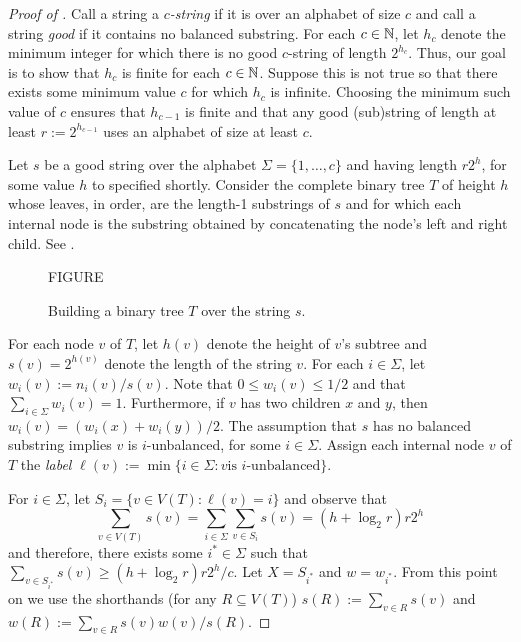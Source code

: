 \documentclass{patmorin}
\begin{document}
\begin{proof}[Proof of ]
  Call a string a \emph{$c$-string} if it is over an alphabet of size $c$
  and call a string \emph{good} if it contains no balanced substring.
  For each $c\in\mathbb{N}$, let $h_c$ denote the minimum integer for which
  there is no good $c$-string of length $2^{h_c}$.  Thus, our goal is
  to show that $h_c$ is finite for each $c\in\mathbb{N}$.
  Suppose this is not true so that there exists some minimum value
  $c$ for which $h_c$ is infinite.  Choosing the minimum such value of 
  $c$ ensures that $h_{c-1}$ is finite and that any good (sub)string of
  length at least $r:=2^{h_{c-1}}$ uses an alphabet of size at least $c$.

  Let $s$ be a good string over the alphabet $\Sigma=\{1,\ldots,c\}$ and having
  length $r2^{h}$, for some value $h$ to specified shortly.   Consider
  the complete binary tree $T$ of height $h$ whose leaves, in order,
  are the length-1 substrings of $s$ and for which each internal node is
  the substring obtained by concatenating the node's left and right child.
  See .

  \begin{figure}
    \begin{center}
       FIGURE 
    \end{center}
    \caption{Building a binary tree $T$ over the string $s$.}
  \end{figure}

  For each node $v$ of $T$, let $h(v)$ denote the height of $v$'s subtree
  and $s(v)=2^{h(v)}$ denote the length of the string $v$. For each
  $i\in\Sigma$, let $w_i(v):=n_i(v)/s(v)$.  Note that $0\le w_i(v)\le
  1/2$ and that $\sum_{i\in\Sigma} w_i(v)=1$.  Furthermore, if $v$
  has two children $x$ and $y$, then $w_i(v) = (w_i(x)+w_i(y))/2$.
  The assumption that $s$ has no balanced substring implies $v$ is
  $i$-unbalanced, for some $i\in\Sigma$.  Assign each internal node
  $v$ of $T$ the \emph{label} $\ell(v):=\min\{i\in\Sigma: \mbox{$v$
  is $i$-unbalanced}\}$.

  For $i\in\Sigma$, let $S_i=\{v\in V(T): \ell(v)=i\}$ and observe that 
  \[
      \sum_{v\in V(T)}s(v)=\sum_{i\in\Sigma} \sum_{v\in S_i} s(v) = (h+\log_2 r)r2^{h}
  \]
  and therefore, there exists some $i^*\in\Sigma$ such that
  $\sum_{v\in S_{i^*}}s(v)\ge (h+\log_2 r)r2^h/c$.  Let $X=S_{i^*}$ and $w=w_{i^*}$. From
  this point on we use the shorthands (for any $R\subseteq V(T)$) 
  $s(R):=\sum_{v\in R}s(v)$ and $w(R):=\sum_{v\in R}s(v)w(v)/s(R)$.


\end{proof}
\end{document}
